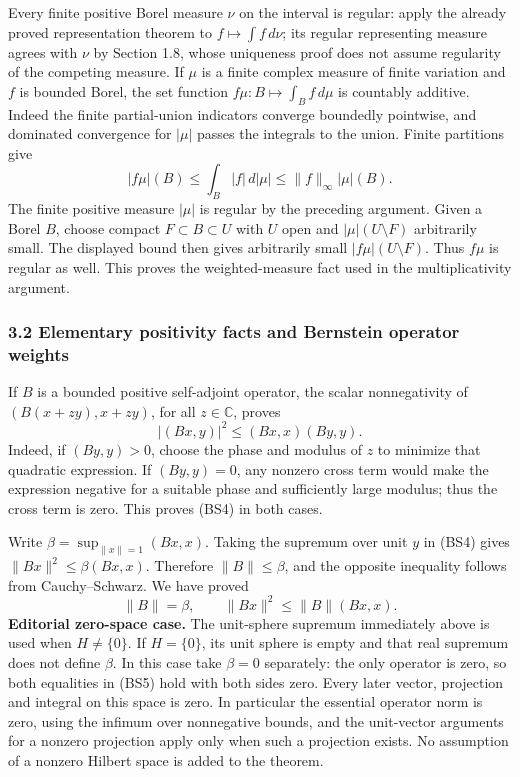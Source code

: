 \documentclass[
  11pt,
]{article}
\begin{document}
Every finite positive Borel measure \(\nu\) on the interval is regular:
apply the already proved representation theorem to
\(f\mapsto\int f\,d\nu\); its regular representing measure agrees with
\(\nu\) by Section 1.8, whose uniqueness proof does not assume
regularity of the competing measure. If \(\mu\) is a finite complex
measure of finite variation and \(f\) is bounded Borel, the set function
\(f\mu:B\mapsto\int_B f\,d\mu\) is countably additive. Indeed the finite
partial-union indicators converge boundedly pointwise, and dominated
convergence for \(|\mu|\) passes the integrals to the union. Finite
partitions give \[
 |f\mu|(B)\leq\int_B|f|\,d|\mu|
                \leq\|f\|_\infty|\mu|(B).
\] The finite positive measure \(|\mu|\) is regular by the preceding
argument. Given a Borel \(B\), choose compact \(F\subset B\subset U\)
with \(U\) open and \(|\mu|(U\setminus F)\) arbitrarily small. The
displayed bound then gives arbitrarily small \(|f\mu|(U\setminus F)\).
Thus \(f\mu\) is regular as well. This proves the weighted-measure fact
used in the multiplicativity argument.

\subsubsection{3.2 Elementary positivity facts and Bernstein operator
weights}\label{elementary-positivity-facts-and-bernstein-operator-weights}

If \(B\) is a bounded positive self-adjoint operator, the scalar
nonnegativity of \((B(x+zy),x+zy)\), for all \(z\in\mathbb C\), proves
\[
 |(Bx,y)|^2\leq(Bx,x)(By,y).
 \tag{BS4}
\] Indeed, if \((By,y)>0\), choose the phase and modulus of \(z\) to
minimize that quadratic expression. If \((By,y)=0\), any nonzero cross
term would make the expression negative for a suitable phase and
sufficiently large modulus; thus the cross term is zero. This proves
(BS4) in both cases.

Write \(\beta=\sup_{\|x\|=1}(Bx,x)\). Taking the supremum over unit
\(y\) in (BS4) gives \(\|Bx\|^2\leq\beta(Bx,x)\). Therefore
\(\|B\|\leq\beta\), and the opposite inequality follows from
Cauchy--Schwarz. We have proved \[
 \|B\|=\beta,\qquad \|Bx\|^2\leq\|B\|(Bx,x).
 \tag{BS5}
\] \textbf{Editorial zero-space case.} The unit-sphere supremum
immediately above is used when \(H\ne\{0\}\). If \(H=\{0\}\), its unit
sphere is empty and that real supremum does not define \(\beta\). In
this case take \(\beta=0\) separately: the only operator is zero, so
both equalities in (BS5) hold with both sides zero. Every later vector,
projection and integral on this space is zero. In particular the
essential operator norm is zero, using the infimum over nonnegative
bounds, and the unit-vector arguments for a nonzero projection apply
only when such a projection exists. No assumption of a nonzero Hilbert
space is added to the theorem.
\end{document}
